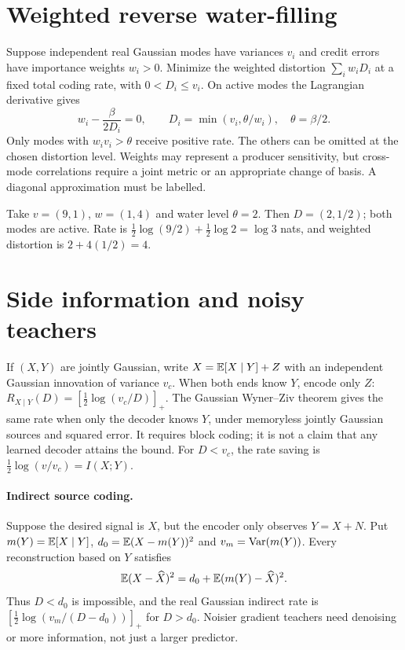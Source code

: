\documentclass[11pt]{article}
\begin{document}
\section{Weighted reverse water-filling}
Suppose independent real Gaussian modes have variances $v_i$ and credit errors have importance weights $w_i>0$. Minimize the weighted distortion $\sum_iw_iD_i$ at a fixed total coding rate, with $0<D_i\le v_i$. On active modes the Lagrangian derivative gives
\[
 w_i-\frac{\beta}{2D_i}=0,\qquad
 D_i=\min(v_i,\theta/w_i),\quad\theta=\beta/2.
\]
Only modes with $w_iv_i>\theta$ receive positive rate. The others can be omitted at the chosen distortion level. Weights may represent a producer sensitivity, but cross-mode correlations require a joint metric or an appropriate change of basis. A diagonal approximation must be labelled.
\begin{example}
Take $v=(9,1)$, $w=(1,4)$ and water level $\theta=2$. Then $D=(2,1/2)$; both modes are active. Rate is $\tfrac12\log(9/2)+\tfrac12\log2=\log3$ nats, and weighted distortion is $2+4(1/2)=4$.
\end{example}
\section{Side information and noisy teachers}
If $(X,Y)$ are jointly Gaussian, write $X=\mathbb{E}[X\mid Y]+Z$ with an independent Gaussian innovation of variance $v_c$. When both ends know $Y$, encode only $Z$: $R_{X\mid Y}(D)=[\tfrac12\log(v_c/D)]_+$. The Gaussian Wyner--Ziv theorem gives the same rate when only the decoder knows $Y$, under memoryless jointly Gaussian sources and squared error. It requires block coding; it is not a claim that any learned decoder attains the bound. For $D<v_c$, the rate saving is $\tfrac12\log(v/v_c)=I(X;Y)$.
\paragraph{Indirect source coding.} Suppose the desired signal is $X$, but the encoder only observes $Y=X+N$. Put $m(Y)=\mathbb{E}[X\mid Y]$, $d_0=\mathbb{E}(X-m(Y))^2$ and $v_m=\operatorname{Var}(m(Y))$. Every reconstruction based on $Y$ satisfies
\[
 \mathbb{E}(X-\widehat X)^2=d_0+\mathbb{E}(m(Y)-\widehat X)^2.
\]
Thus $D<d_0$ is impossible, and the real Gaussian indirect rate is $[\tfrac12\log(v_m/(D-d_0))]_+$ for $D>d_0$. Noisier gradient teachers need denoising or more information, not just a larger predictor.
\end{document}
